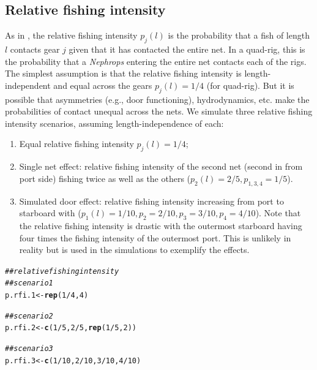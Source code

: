 \documentclass[12pt]{article}\usepackage[]{graphicx}\usepackage[]{color}
\makeatletter
\newcommand{\hlnum}[1]{\textcolor[rgb]{0.686,0.059,0.569}{#1}}%
\newcommand{\hlcom}[1]{\textcolor[rgb]{0.678,0.584,0.686}{\textit{#1}}}%
\newcommand{\hlopt}[1]{\textcolor[rgb]{0,0,0}{#1}}%
\newcommand{\hlstd}[1]{\textcolor[rgb]{0.345,0.345,0.345}{#1}}%
\newcommand{\hlkwb}[1]{\textcolor[rgb]{0.69,0.353,0.396}{#1}}%
\newcommand{\hlkwd}[1]{\textcolor[rgb]{0.737,0.353,0.396}{\textbf{#1}}}%
\newenvironment{kframe}{%
 \def\at@end@of@kframe{}%
 \ifinner\ifhmode%
  \def\at@end@of@kframe{\end{minipage}}%
  \begin{minipage}{\columnwidth}%
 \fi\fi%
 \def\FrameCommand##1{\hskip\@totalleftmargin \hskip-\fboxsep
 \colorbox{shadecolor}{##1}\hskip-\fboxsep
     \hskip-\linewidth \hskip-\@totalleftmargin \hskip\columnwidth}%
 \MakeFramed {\advance\hsize-\width
   \@totalleftmargin\z@ \linewidth\hsize
   \@setminipage}}%
 {\par\unskip\endMakeFramed%
 \at@end@of@kframe}
\newenvironment{knitrout}{}{} %
\makeatother
\begin{document}
\subsection{Relative fishing intensity}
As in \citep{Millar:Fryer:1999}, the relative fishing intensity $p_j(l)$ is the probability that a fish of length $l$ contacts gear $j$ given that it has contacted the entire net. In a quad-rig, this is the probability that a \emph{Nephrops} entering the entire net contacts each of the rigs. The simplest assumption is that the relative fishing intensity is length-independent and equal across the gears $p_j(l) = 1/4$ (for quad-rig). But it is possible that asymmetries (e.g., door functioning), hydrodynamics, etc. make the probabilities of contact unequal across the nets. We simulate three relative fishing intensity scenarios, assuming length-independence of each:
\begin{enumerate}
  \item Equal relative fishing intensity $p_j(l) = 1/4$;
  \item Single net effect: relative fishing intensity of the second net (second in from port side) fishing twice as well as the others ($p_2(l) = 2/5, p_{1,3,4} = 1/5$).
  \item Simulated door effect: relative fishing intensity increasing from port to starboard with  ($p_1(l) = 1/10, p_2 = 2/10, p_3 = 3/10, p_4 = 4/10$). Note that the relative fishing intensity is drastic with the outermost starboard having four times the fishing intensity of the outermost port. This is unlikely in reality but is used in the simulations to exemplify the effects.
\end{enumerate}

\begin{knitrout}\footnotesize
{}\color{fgcolor}\begin{kframe}
\begin{alltt}
\hlcom{## relative fishing intensity}
\hlcom{## scenario 1}
\hlstd{p.rfi.1} \hlkwb{<-} \hlkwd{rep}\hlstd{(}\hlnum{1}\hlopt{/}\hlnum{4}\hlstd{,} \hlnum{4}\hlstd{)}

\hlcom{## scenario 2}
\hlstd{p.rfi.2} \hlkwb{<-} \hlkwd{c}\hlstd{(}\hlnum{1}\hlopt{/}\hlnum{5}\hlstd{,} \hlnum{2}\hlopt{/}\hlnum{5}\hlstd{,} \hlkwd{rep}\hlstd{(}\hlnum{1}\hlopt{/}\hlnum{5}\hlstd{,} \hlnum{2}\hlstd{))}

\hlcom{## scenario 3}
\hlstd{p.rfi.3} \hlkwb{<-} \hlkwd{c}\hlstd{(}\hlnum{1}\hlopt{/}\hlnum{10}\hlstd{,} \hlnum{2}\hlopt{/}\hlnum{10}\hlstd{,} \hlnum{3}\hlopt{/}\hlnum{10}\hlstd{,} \hlnum{4}\hlopt{/}\hlnum{10}\hlstd{)}
\end{alltt}
\end{kframe}
\end{knitrout}
\end{document}
